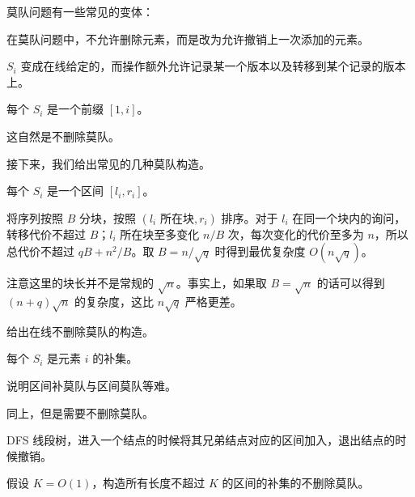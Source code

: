 莫队问题有一些常见的变体：

\begin{definition}
    在莫队问题中，不允许删除元素，而是改为允许撤销上一次添加的元素。
\end{definition}
\begin{definition}[在线莫队]
    $S_i$ 变成在线给定的，而操作额外允许记录某一个版本以及转移到某个记录的版本上。
\end{definition}

\begin{example}
    每个 $S_i$ 是一个前缀 $[1,i]$。
\end{example}
\begin{remark}
    这自然是不删除莫队。
\end{remark}

接下来，我们给出常见的几种莫队构造。

\begin{example}[区间莫队]
    每个 $S_i$ 是一个区间 $[l_i,r_i]$。
\end{example}
\begin{solution}
    将序列按照 $B$ 分块，按照 $(l_i\text{ 所在块},r_i)$ 排序。对于 $l_i$ 在同一个块内的询问，转移代价不超过 $B$；$l_i$ 所在块至多变化 $n/B$ 次，每次变化的代价至多为 $n$，所以总代价不超过 $qB+n^2/B$。取 $B=n/\sqrt{q}$ 时得到最优复杂度 $O(n\sqrt{q})$。
\end{solution}
\begin{remark}
    注意这里的块长并不是常规的 $\sqrt{n}$。事实上，如果取 $B=\sqrt{n}$ 的话可以得到 $(n+q)\sqrt{n}$ 的复杂度，这比 $n\sqrt{q}$ 严格更差。
\end{remark}
\begin{exercise}
    给出在线不删除莫队的构造。
\end{exercise}

\begin{example}[单点补莫队]
    每个 $S_i$ 是元素 $i$ 的补集。
\end{example}
\begin{exercise}
    说明区间补莫队与区间莫队等难。
\end{exercise}

\begin{example}
    同上，但是需要不删除莫队。
\end{example}
\begin{solution}
    DFS 线段树，进入一个结点的时候将其兄弟结点对应的区间加入，退出结点的时候撤销。
\end{solution}
\begin{exercise}
   假设 $K=O(1)$，构造所有长度不超过 $K$ 的区间的补集的不删除莫队。     
\end{exercise}


